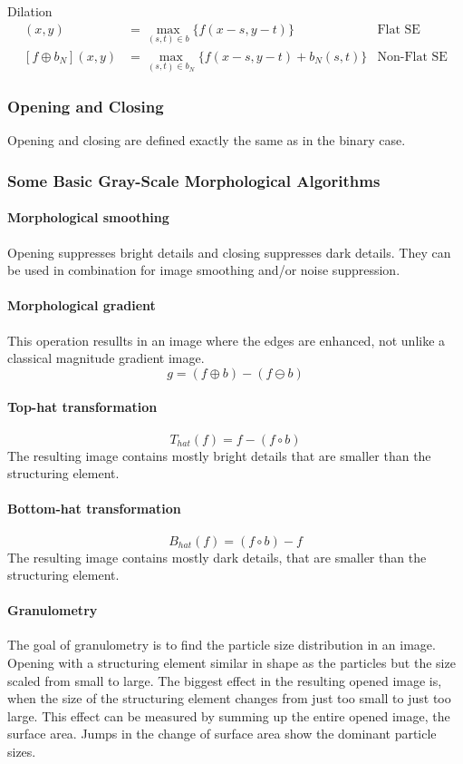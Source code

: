 Dilation
\begin{align*}
	[f\oplus b](x,y)	&= \max_{(s,t)\in b} \{f(x-s,y-t)\}				& \text{Flat SE} \\
	[f\oplus b_N](x,y)	&= \max_{(s,t)\in b_N} \{f(x-s,y-t) +b_N(s,t)\}	& \text{Non-Flat SE} 
\end{align*}

\subsubsection{Opening and Closing}
Opening and closing are defined exactly the same as in the binary case.

\subsubsection{Some Basic Gray-Scale Morphological Algorithms}
\paragraph{Morphological smoothing}
Opening suppresses bright details and closing suppresses dark details. They can be used in combination for image smoothing and/or noise suppression.
\paragraph{Morphological gradient}
This operation resullts in an image where the edges are enhanced, not unlike a classical magnitude gradient image.
\[
	g=(f\oplus b)-(f\ominus b)
\]
\paragraph{Top-hat transformation}
\[
	T_{hat}(f) = f -(f \circ b)
\]
The resulting image contains mostly bright details that are smaller than the structuring element.
\paragraph{Bottom-hat transformation}
\[
	B_{hat}(f) = (f \circ b)-f
\]
The resulting image contains mostly dark details, that are smaller than the structuring element.
\paragraph{Granulometry}
The goal of granulometry is to find the particle size distribution in an image. Opening with a structuring element similar in shape as the particles but the size scaled from small to large. The biggest effect in the resulting opened image is, when the size of the structuring element changes from just too small to just too large. This effect can be measured by summing up the entire opened image, the surface area. Jumps in the change of surface area show the dominant particle sizes.
